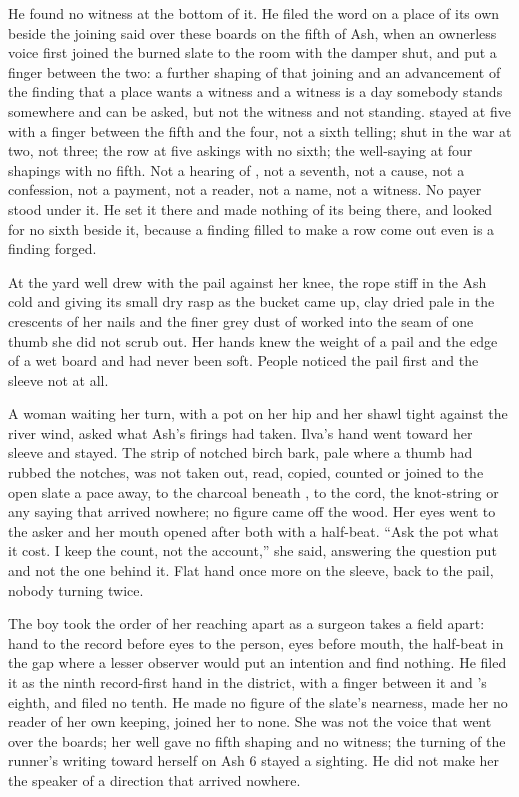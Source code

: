 He found no witness at the bottom of it. He filed the word on a place of its own beside the joining said over these boards on the fifth of Ash, when an ownerless voice first joined the burned slate to the room with the damper shut, and put a finger between the two: a further shaping of that joining and an advancement of the finding that a place wants a witness and a witness is a day somebody stands somewhere and can be asked, but not the witness and not standing.  stayed at five with a finger between the fifth and the four, not a sixth telling;  shut in the war at two, not three; the row at five askings with no sixth; the well-saying at four shapings with no fifth. Not a hearing of , not a seventh, not a cause, not a confession, not a payment, not a reader, not a name, not a witness. No payer stood under it. He set it there and made nothing of its being there, and looked for no sixth beside it, because a finding filled to make a row come out even is a finding forged.

\scenebreak

At the yard well  drew with the pail against her knee, the rope stiff in the Ash cold and giving its small dry rasp as the bucket came up, clay dried pale in the crescents of her nails and the finer grey dust of  worked into the seam of one thumb she did not scrub out. Her hands knew the weight of a pail and the edge of a wet board and had never been soft. People noticed the pail first and the sleeve not at all.

A woman waiting her turn, with a pot on her hip and her shawl tight against the river wind, asked what Ash's firings had taken. Ilva's hand went toward her sleeve and stayed. The strip of notched birch bark, pale where a thumb had rubbed the notches, was not taken out, read, copied, counted or joined to the open slate a pace away, to the charcoal beneath , to the cord, the knot-string or any saying that arrived nowhere; no figure came off the wood. Her eyes went to the asker and her mouth opened after both with a half-beat. “Ask the pot what it cost. I keep the count, not the account,” she said, answering the question put and not the one behind it. Flat hand once more on the sleeve, back to the pail, nobody turning twice.

The boy took the order of her reaching apart as a surgeon takes a field apart: hand to the record before eyes to the person, eyes before mouth, the half-beat in the gap where a lesser observer would put an intention and find nothing. He filed it as the ninth record-first hand in the district, with a finger between it and 's eighth, and filed no tenth. He made no figure of the slate's nearness, made her no reader of her own keeping, joined her to none. She was not the voice that went over the boards; her well gave no fifth shaping and no witness; the turning of the runner's writing toward herself on Ash 6 stayed a sighting. He did not make her the speaker of a direction that arrived nowhere.

